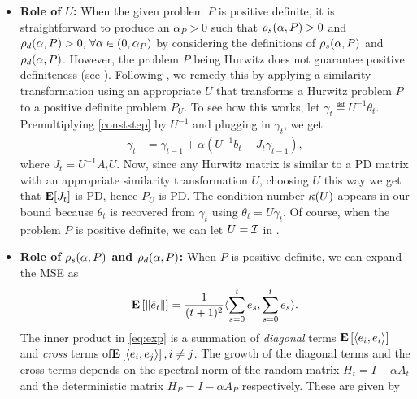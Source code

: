\begin{itemize}[leftmargin=*, before = \leavevmode\vspace{-\baselineskip}]
\item \textbf{Role of $U$:} When the given problem $P$ is positive definite, it is straightforward to produce an $\alpha_P>0$ such that $\rho_s(\alpha,P)>0$ and $\rho_d(\alpha,P)>0,\,\forall \alpha\in(0,\alpha_P)$ by considering the definitions of $\rho_s(\alpha,P)$ and $\rho_d(\alpha,P)$. 
However, the problem $P$ being Hurwitz does not guarantee positive definiteness (see ). 
Following  \cite{lihong}, we remedy this 
by applying a similarity transformation using an appropriate $U$ that transforms a Hurwitz problem $P$ to a positive definite problem $P_U$. To see how this works, let $\gamma_t\eqdef U^{-1 }\theta_t$. Premultiplying 
 \eqref{conststep} by $U^{-1}$ and plugging in $\gamma_t$, we get
\begin{align*}
\gamma_t&=\gamma_{t-1}+\alpha(U^{-1} b_t- J_t\gamma_{t-1}),
\end{align*}
where $J_t = U^{-1}A_t U$.
Now, since any Hurwitz matrix is similar to a PD matrix with an appropriate similarity transformation $U$, choosing $U$ this way we get that $\mathbf{E}[J_t]$ is PD, hence $P_U$ is PD.
The condition number $\kappa(U)$ appears in our bound because $\theta_t$ is recovered from $\gamma_t$ using
$\theta_t=U\gamma_t$. Of course, when the problem $P$ is positive definite, we can let $U=\mathcal{I}$ in . 
\item \textbf{Role of $\rho_s(\alpha,P)$ and $\rho_d(\alpha,P)$:} When $P$ is positive definite, we can expand the MSE as \begin{align}\label{eq:exp}\mathbf{E}\left[\left\| \hat{e}_t\right\|\right]=\frac{1}{(t+1)^2}\langle\sum_{s=0}^t e_s,\sum_{s=0}^t e_s\rangle.\end{align} The inner product in \eqref{eq:exp} is a summation of \emph{diagonal} terms $\mathbf{E}\left[\langle e_i,e_i\rangle\right]$ and \emph{cross} terms of$\mathbf{E}\left[\langle e_i,e_j\rangle\right],i\neq j$. The growth of the diagonal terms and the cross terms depends on the spectral norm of the random matrix $H_t=I-\alpha A_t$ and the deterministic matrix $H_P=I-\alpha A_P$ respectively. These are given by
\begin{comment}
The output $\thh_t$ of the algorithm \eqref{eq:lsa} is the average of the internal states at times $s=0,\ldots,t-1$. The error dynamics of the internal states by looking at the behavior of $e_t\eqdef \theta_t-\ts$.

\end{comment}
\end{itemize}
